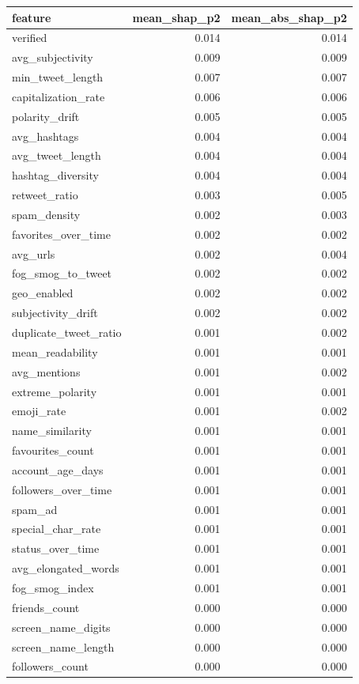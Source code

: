 \begin{tabular}{lrr}
\toprule
feature & mean_shap_p2 & mean_abs_shap_p2 \\
\midrule
verified & 0.014 & 0.014 \\
avg_subjectivity & 0.009 & 0.009 \\
min_tweet_length & 0.007 & 0.007 \\
capitalization_rate & 0.006 & 0.006 \\
polarity_drift & 0.005 & 0.005 \\
avg_hashtags & 0.004 & 0.004 \\
avg_tweet_length & 0.004 & 0.004 \\
hashtag_diversity & 0.004 & 0.004 \\
retweet_ratio & 0.003 & 0.005 \\
spam_density & 0.002 & 0.003 \\
favorites_over_time & 0.002 & 0.002 \\
avg_urls & 0.002 & 0.004 \\
fog_smog_to_tweet & 0.002 & 0.002 \\
geo_enabled & 0.002 & 0.002 \\
subjectivity_drift & 0.002 & 0.002 \\
duplicate_tweet_ratio & 0.001 & 0.002 \\
mean_readability & 0.001 & 0.001 \\
avg_mentions & 0.001 & 0.002 \\
extreme_polarity & 0.001 & 0.001 \\
emoji_rate & 0.001 & 0.002 \\
name_similarity & 0.001 & 0.001 \\
favourites_count & 0.001 & 0.001 \\
account_age_days & 0.001 & 0.001 \\
followers_over_time & 0.001 & 0.001 \\
spam_ad & 0.001 & 0.001 \\
special_char_rate & 0.001 & 0.001 \\
status_over_time & 0.001 & 0.001 \\
avg_elongated_words & 0.001 & 0.001 \\
fog_smog_index & 0.001 & 0.001 \\
friends_count & 0.000 & 0.000 \\
screen_name_digits & 0.000 & 0.000 \\
screen_name_length & 0.000 & 0.000 \\
followers_count & 0.000 & 0.000 \\

\end{tabular}
